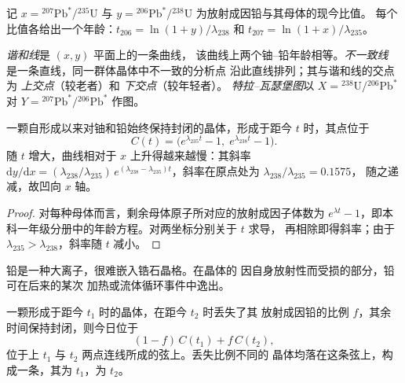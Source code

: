 记 $x = {}^{207}\mathrm{Pb}^*/{}^{235}\mathrm{U}$ 与 $y =
{}^{206}\mathrm{Pb}^*/{}^{238}\mathrm{U}$ 为放射成因铅与其母体的现今比值。
每个比值各给出一个年龄：$t_{206} = \ln(1 + y)/\lambda_{238}$
和 $t_{207} = \ln(1 + x)/\lambda_{235}$。

\begin{definition}
\label{def:b3:advanced-geochronology:concordia}
\emph{谐和线}是 $(x, y)$ 平面上的一条曲线，
该曲线上两个铀–铅年龄相等。\emph{不一致线}
是一条直线，同一群体晶体中不一致的分析点
沿此直线排列；其与谐和线的交点为
\emph{上交点}（较老者）和
\emph{下交点}（较年轻者）。
\emph{特拉–瓦瑟堡图}以
$X = {}^{238}\mathrm{U}/{}^{206}\mathrm{Pb}^*$ 对 $Y =
{}^{207}\mathrm{Pb}^*/{}^{206}\mathrm{Pb}^*$ 作图。
\end{definition}

\begin{theorem}[谐和线]\label{thm:b3:advanced-geochronology:concordia}
一颗自形成以来对铀和铅始终保持封闭的晶体，形成于距今
$t$ 时，其点位于
\[
C(t) = \bigl(e^{\lambda_{235}t} - 1,\; e^{\lambda_{238}t} - 1\bigr).
\]
随 $t$ 增大，曲线相对于 $x$ 上升得越来越慢：其斜率
$\mathrm dy/\mathrm dx = (\lambda_{238}/\lambda_{235})\,e^{(\lambda_{238} -
\lambda_{235})t}$，斜率在原点处为 $\lambda_{238}/\lambda_{235} = 0.1575$，
随之递减，故凹向 $x$ 轴。
\end{theorem}

\begin{proof}
对每种母体而言，剩余母体原子所对应的放射成因子体数为
$e^{\lambda t} - 1$，即本科一年级分册中的年龄方程。对两坐标分别关于 $t$ 求导，
再相除即得斜率；由于
$\lambda_{235} > \lambda_{238}$，斜率随 $t$ 减小。
\end{proof}

铅是一种大离子，很难嵌入锆石晶格。在晶体的
因自身放射性而受损的部分，铅可在后来的某次
加热或流体循环事件中逸出。

\begin{theorem}[阶段性铅丢失给出弦]\label{thm:b3:advanced-geochronology:discordia}
一颗形成于距今 $t_1$ 时的晶体，在距今 $t_2$ 时丢失了其
放射成因铅的比例 $f$，其余时间保持封闭，则今日位于
\[
(1 - f)\,C(t_1) + f\,C(t_2),
\]
位于上 $t_1$ 与 $t_2$ 两点连线所成的弦上。丢失比例不同的
晶体均落在这条弦上，构成一条，其为
$t_1$，为 $t_2$。
\end{theorem}

